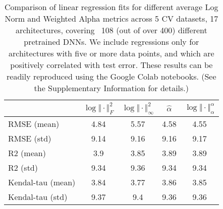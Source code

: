 
\begin{table}[t]
\small
\begin{center}
\begin{tabular}{|p{1.25in}|c|c|c|c|}
\hline
  & $\log\Vert\cdot\Vert^{2}_{F}$ & $\log\Vert\cdot\Vert^{2}_{\infty}$ & $\hat{\alpha}$ & $\log\Vert\cdot\Vert^{\alpha}_{\alpha}$ \\
\hline

RMSE (mean) & 4.84 & 5.57 & 4.58& 4.55 \\
RMSE (std) & 9.14 & 9.16 & 9.16& 9.17 \\
\hline
R2 (mean) & 3.9 & 3.85 & 3.89& 3.89 \\
R2 (std) & 9.34 & 9.36 & 9.34& 9.34 \\
\hline
Kendal-tau (mean) & 3.84 & 3.77 & 3.86& 3.85 \\
Kendal-tau (std) & 9.37 & 9.4 & 9.36& 9.36 \\
\hline

\hline
\end{tabular}
\end{center}
\caption{Comparison of linear regression fits for different average Log Norm and Weighted Alpha metrics across 5 CV datasets, 17 architectures, covering \
108 (out of over 400) different pretrained DNNs.
         We include regressions only for architectures with five or more data points, and which are positively correlated with test error.
         These results can be readily reproduced using the Google Colab notebooks.
         (See the Supplementary Information
         for details.)}
\label{table:results}
\end{table}


